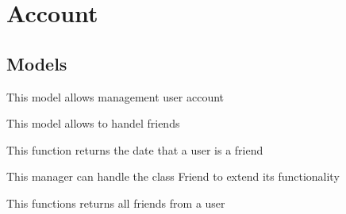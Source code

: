 \documentclass[letterpaper,10pt,english]{sphinxmanual}
\begin{document}
\section{Account}
\label{modules/account:account}\label{modules/account::doc}

\subsection{Models}
\label{modules/account:models}
This model allows management user account
\label{modules/account:module-apps.account.models}

\begin{fulllineitems}
\label{modules/account:apps.account.models.Friend}
This model allows to handel friends

\begin{fulllineitems}
\label{modules/account:apps.account.models.Friend.date_since}
This function returns the date that a user is a friend

\end{fulllineitems}


\end{fulllineitems}


\begin{fulllineitems}
\label{modules/account:apps.account.models.FriendManager}
This manager can handle the class Friend to extend its functionality

\begin{fulllineitems}
\label{modules/account:apps.account.models.FriendManager.getAllFriends}
This functions returns all friends from a user

\end{fulllineitems}


\end{fulllineitems}

\end{document}
